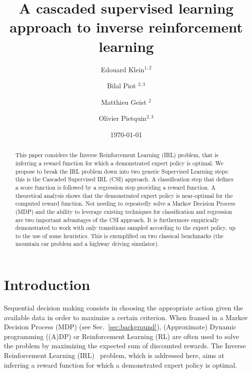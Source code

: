 \documentclass[smallextended]{svjour3}
\begin{document}
\title{A cascaded supervised learning approach to inverse reinforcement learning}
\author{Edouard Klein$^{1,2}$ \and Bilal Piot $^{2,3}$\and Matthieu Geist $^{2}$\and Olivier Pietquin$^{2,3}$}
\date{\today}


\maketitle

\begin{abstract}
  This paper considers the Inverse Reinforcement Learning (IRL) problem, that is inferring a reward function for which a demonstrated expert policy is optimal.
We propose to break the IRL problem down into two generic Supervised Learning steps: this is the Cascaded Supervised IRL (CSI) approach. A classification step that defines a score function is followed by a regression step providing a reward function.
A theoretical analysis shows that the demonstrated expert policy is near-optimal for the computed reward function.
Not needing to repeatedly solve a Markov Decision Process (MDP) and the ability to leverage existing techniques for classification and regression are two important advantages of the CSI approach. It is furthermore empirically demonstrated to work with only transitions sampled according to the expert policy, up to the use of some heuristics. This is exemplified on two classical benchmarks (the mountain car problem and a highway driving simulator).
  \end{abstract}
\section{Introduction}
\label{sec-2}
Sequential decision making consists in choosing the appropriate action given the available data in order to maximize a certain criterion. When framed in a Markov Decision Process (MDP) (see Sec.~\ref{sec:background}), (Approximate) Dynamic programming ((A)DP) or Reinforcement Learning (RL) are often used to solve the problem by maximizing the expected sum of discounted rewards. The Inverse Reinforcement Learning (IRL)~\cite{russell1998learning} problem, which is addressed here, aims at inferring a reward function for which a demonstrated expert policy is optimal.
\end{document}
